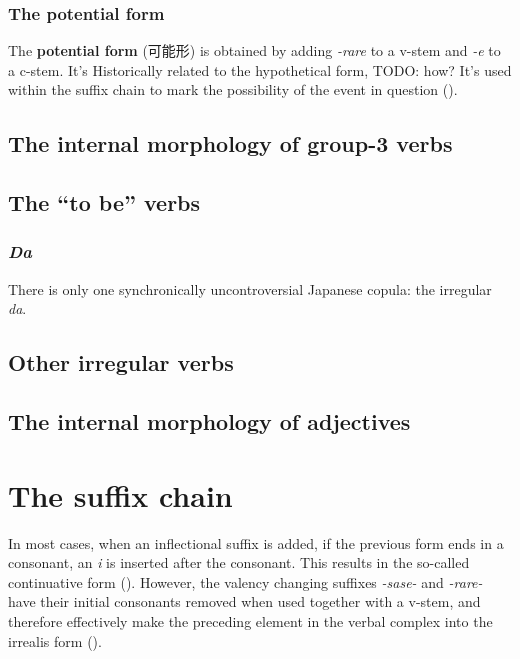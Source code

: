 \documentclass[UTF8, a4paper, oneside, scheme=plain]{ctexrep}
\newcommand*{\concept}[1]{\textbf{#1}}
\newcommand{\corpus}[1]{\emph{#1}}
\begin{document}
\subsubsection{The potential form}\label{sec:potential-form}

The \concept{potential form} (可能形) is obtained by adding \corpus{-rare} to a v-stem 
and \corpus{-e} to a c-stem.
It's Historically related to the hypothetical form, TODO: how?
It's used within the suffix chain to mark the possibility of the event in question 
().

\subsection{The internal morphology of group-3 verbs}

\subsection{The ``to be'' verbs}

\subsubsection{\corpus{Da}}

There is only one synchronically uncontroversial Japanese copula:
the irregular \corpus{da}.


\subsection{Other irregular verbs}

\subsection{The internal morphology of adjectives}



\section{The suffix chain}\label{sec:suffix-chain}

In most cases,
when an inflectional suffix is added,
if the previous form ends in a consonant,
an \corpus{i} is inserted after the consonant.
This results in the so-called continuative form ().
However, the valency changing suffixes \corpus{-sase-} and \corpus{-rare-}
have their initial consonants removed when used together with a v-stem,
and therefore effectively make the preceding element in the verbal complex into the irrealis form 
().
\end{document}
